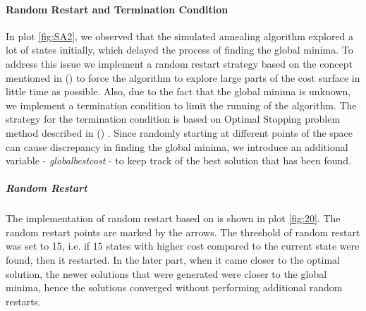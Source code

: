 \paragraph{Random Restart and Termination Condition}
In plot \ref{fig:SA2}, we observed that the simulated annealing algorithm explored a lot of states initially, which delayed the process of finding the global minima. To address this issue we implement a random restart strategy based on the concept mentioned in (\citet{mendivil2001restarting}) to force the algorithm to explore large parts of the cost surface in little time as possible. Also, due to the fact that the global minima is unknown, we implement a termination condition to limit the running of the algorithm. The strategy for the termination condition is based on Optimal Stopping problem method described in (\citet{alizamir2008improving}) . Since randomly starting at different points of the space can cause discrepancy in finding the global minima, we introduce an additional variable - \textit{globalbestcost} - to keep track of the best solution that has been found. 
\subparagraph{Random Restart}
The implementation of random restart based on \citet{mendivil2001restarting} is shown in plot \ref{fig:20}. The random restart points are marked by the arrows. The threshold of random restart was set to 15, i.e. if 15 states with higher cost compared to the current state were found, then it restarted. In the later part, when it came closer to the optimal solution, the newer solutions that were generated were closer to the global minima, hence the solutions converged without performing additional random restarts.
